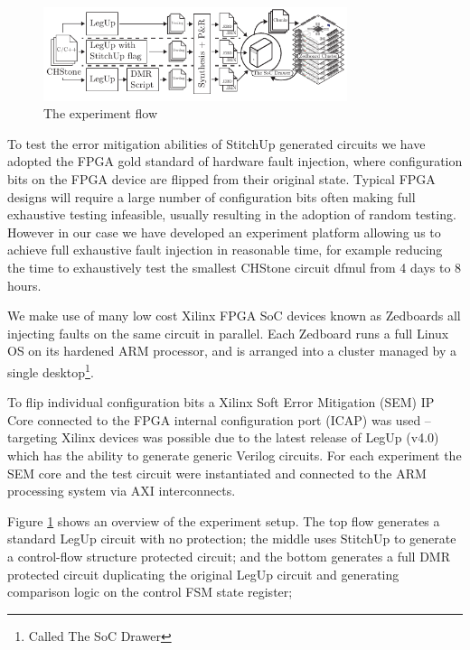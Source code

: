 \begin{figure}[t]
\centering
\includegraphics[width=3.5in]{./imgs/ExperimentFlow.pdf}
\caption{The experiment flow}
\label{fig:ExperimentFlow}
\end{figure}

To test the error mitigation abilities of StitchUp generated circuits we have adopted the
FPGA gold standard of hardware fault injection, where configuration bits on the 
FPGA device are flipped from their original state.
Typical FPGA designs will require a large number of configuration bits often making
full exhaustive testing infeasible, usually resulting in the adoption of random
testing.
However in our case we have developed an experiment
platform allowing us to achieve full exhaustive fault injection in reasonable time,
for example reducing the time to exhaustively test the smallest CHStone circuit dfmul from 4 days
to 8 hours.

We make use of many low cost Xilinx FPGA SoC devices known as
Zedboards all injecting faults on the same circuit in parallel.
Each Zedboard runs a full Linux OS on its hardened ARM processor, and is arranged into
a cluster managed by a single desktop\footnote{Called The SoC Drawer}.

To flip individual configuration bits a Xilinx Soft Error Mitigation (SEM) IP Core
connected to the FPGA internal configuration port (ICAP) was used --
targeting Xilinx devices was possible due to the latest release of LegUp
(v4.0) which has the ability to generate generic Verilog circuits.
For each experiment the SEM core and the test circuit were instantiated and connected to the
ARM processing system via AXI interconnects.

Figure \ref{fig:ExperimentFlow} shows an overview of the experiment setup.
The top flow generates a standard LegUp circuit with no protection;
the middle uses StitchUp to generate a control-flow structure protected circuit;
and the bottom generates a full DMR protected circuit duplicating the original LegUp
circuit and generating comparison logic on the control FSM state register;

